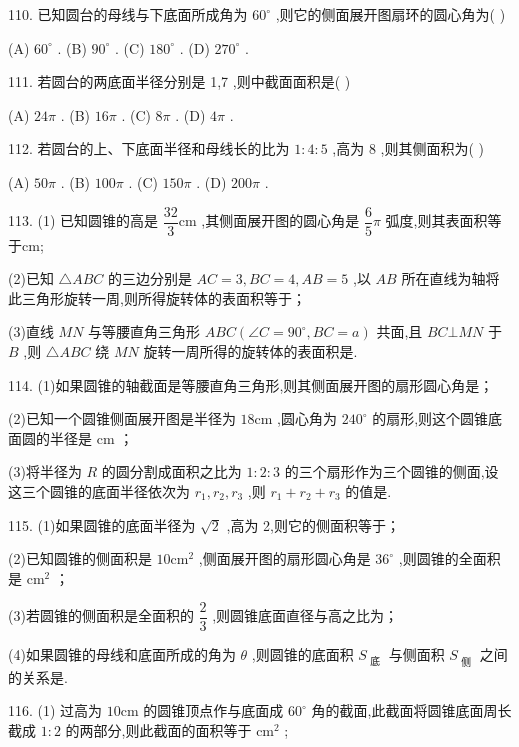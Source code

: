 110. 已知圆台的母线与下底面所成角为 ${60}^{ \circ  }$ ,则它的侧面展开图扇环的圆心角为(   )

(A) ${60}^{ \circ  }$ . (B) ${90}^{ \circ  }$ . (C) ${180}^{ \circ  }$ . (D) ${270}^{ \circ  }$ .

111. 若圆台的两底面半径分别是 1,7 ,则中截面面积是(   )

(A) ${24\pi }$ . (B) ${16\pi }$ . (C) ${8\pi }$ . (D) ${4\pi }$ .

112. 若圆台的上、下底面半径和母线长的比为 $1 : 4 : 5$ ,高为 8 ,则其侧面积为(   )

(A) ${50\pi }$ . (B) ${100\pi }$ . (C) ${150\pi }$ . (D) ${200\pi }$ .

113. (1) 已知圆锥的高是 $\dfrac{32}{3}\mathrm{{cm}}$ ,其侧面展开图的圆心角是 $\dfrac{6}{5}\pi$ 弧度,则其表面积等于\blkda{}cm;

(2)已知 $\bigtriangleup  {ABC}$ 的三边分别是 ${AC} = 3,{BC} = 4,{AB} = 5$ ,以 ${AB}$ 所在直线为轴将此三角形旋转一周,则所得旋转体的表面积等于\blkda{}；

(3)直线 ${MN}$ 与等腰直角三角形 ${ABC}\left( {\angle C = {90}^{ \circ  },{BC} = a}\right)$ 共面,且 ${BC}\bot {MN}$ 于 $B$ ,则 $\bigtriangleup  {ABC}$ 绕 ${MN}$ 旋转一周所得的旋转体的表面积是\blkda{}.

114. (1)如果圆锥的轴截面是等腰直角三角形,则其侧面展开图的扇形圆心角是\blkda{}；

(2)已知一个圆锥侧面展开图是半径为 ${18}\mathrm{{cm}}$ ,圆心角为 ${240}^{ \circ  }$ 的扇形,则这个圆锥底面圆的半径是\blkda{} $\mathrm{{cm}}$ ；

(3)将半径为 $R$ 的圆分割成面积之比为 $1 : 2 : 3$ 的三个扇形作为三个圆锥的侧面,设这三个圆锥的底面半径依次为 ${r}_{1},{r}_{2},{r}_{3}$ ,则 ${r}_{1} + {r}_{2} + {r}_{3}$ 的值是\blkda{}.

115. (1)如果圆锥的底面半径为 $\sqrt{2}$ ,高为 2,则它的侧面积等于\blkda{}；

(2)已知圆锥的侧面积是 ${10}{\mathrm{{cm}}}^{2}$ ,侧面展开图的扇形圆心角是 ${36}^{ \circ  }$ ,则圆锥的全面积是\blkda{} ${\mathrm{{cm}}}^{2}$ ；

(3)若圆锥的侧面积是全面积的 $\dfrac{2}{3}$ ,则圆锥底面直径与高之比为\blkda{}；

(4)如果圆锥的母线和底面所成的角为 $\theta$ ,则圆锥的底面积 ${S}_{\text{ 底 }}$ 与侧面积 ${S}_{\text{ 侧 }}$ 之间的关系是\blkda{}.

116. (1) 过高为 ${10}\mathrm{{cm}}$ 的圆锥顶点作与底面成 ${60}^{ \circ  }$ 角的截面,此截面将圆锥底面周长截成 $1 : 2$ 的两部分,则此截面的面积等于\blkda{} ${\mathrm{{cm}}}^{2}$ ;

